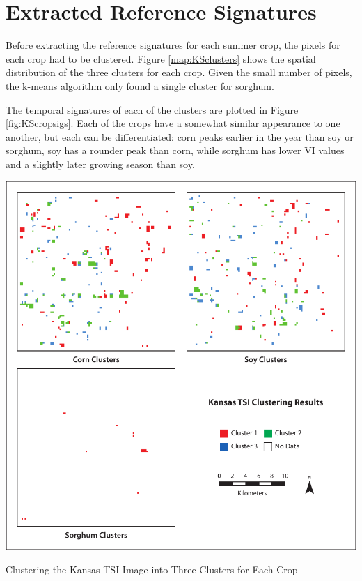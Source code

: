 \section{Extracted Reference Signatures}

Before extracting the reference signatures for each summer crop, the pixels for each crop had to be clustered. Figure \ref{map:KSclusters} shows the spatial distribution of the three clusters for each crop. Given the small number of pixels, the k-means algorithm only found a single cluster for sorghum.

The temporal signatures of each of the clusters are plotted in Figure \ref{fig:KScropsigs}. Each of the crops have a somewhat similar appearance to one another, but each can be differentiated: corn peaks earlier in the year than soy or sorghum, soy has a rounder peak than corn, while sorghum has lower VI values and a slightly later growing season than soy.

\begin{ssfigure}
  \centering
  \includegraphics[width=\textwidth]{Graphics/KSclustered.pdf}
  \caption{Clustering the Kansas TSI Image into Three Clusters for Each Crop}
  \label{map:KSclusters}
\end{ssfigure}


